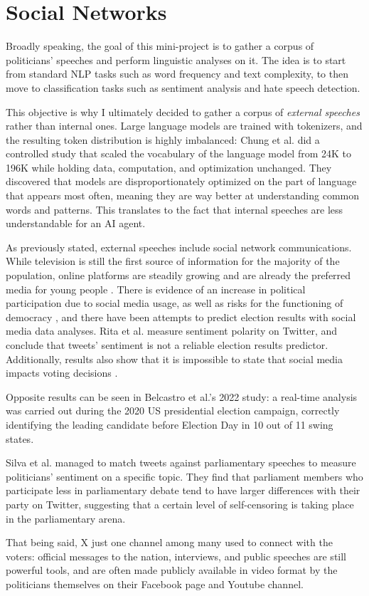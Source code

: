 \section{Social Networks}

Broadly speaking, the goal of this mini-project is to gather a corpus of politicians' speeches and perform linguistic analyses on it. The idea is to start from standard NLP tasks such as word frequency and text complexity, to then move to classification tasks such as sentiment analysis and hate speech detection.

This objective is why I ultimately decided to gather a corpus of \textit{external speeches} rather than internal ones. Large language models are trained with tokenizers, and the resulting token distribution is highly imbalanced: Chung et al. \cite{chung_exploiting_2025} did a controlled study that scaled the vocabulary of the language model from 24K to 196K while holding data, computation, and optimization unchanged. They discovered that models are disproportionately optimized on the part of language that appears most often, meaning they are way better at understanding common words and patterns. This translates to the fact that internal speeches are less understandable for an AI agent. 

As previously stated, external speeches include social network communications. While television is still the first source of information for the majority of the population, online platforms are steadily growing and are already the preferred media for young people \cite{eurobarometer_media_2023,maher_twice_2024}. There is evidence of an increase in political participation due to social media usage, as well as risks for the functioning of democracy \cite{lorenz-spreen_systematic_2023,amsalem_people_2023}, and there have been attempts to predict election results with social media data analyses. Rita et al. measure sentiment polarity on Twitter, and conclude that tweets' sentiment is not a reliable election results predictor. Additionally, results also show that it is impossible to state that social media impacts voting decisions \cite{rita_social_2023}. 

Opposite results can be seen in Belcastro et al.'s \cite{belcastro_analyzing_2022} 2022 study: a real-time analysis was carried out during the 2020 US presidential election campaign, correctly identifying the leading candidate before Election Day in 10 out of 11 swing states.

Silva et al. \cite{silva_politicians_2022} managed to match tweets against parliamentary speeches to measure politicians' sentiment on a specific topic. They find that parliament members who participate less in parliamentary debate tend to have larger differences with their party on Twitter, suggesting that a certain level of self-censoring is taking place in the parliamentary arena.

That being said, X just one channel among many used to connect with the voters: official messages to the nation, interviews, and public speeches are still powerful tools, and are often made publicly available in video format by the politicians themselves on their Facebook page and Youtube channel.
